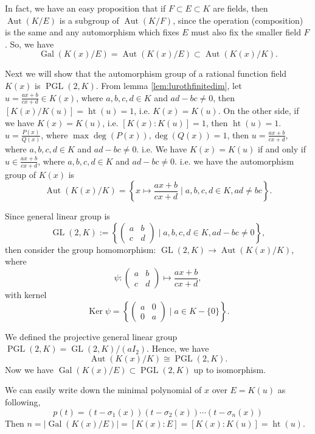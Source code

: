 In fact, we have an easy proposition that if $F\subset E\subset K$ are fields, then $\operatorname{Aut}(K/E)$ is a subgroup of $\operatorname{Aut}(K/F)$, since the operation (composition) is the same
and any automorphism which fixes $E$ must also fix the smaller field $F$. So, we have 
$$\operatorname{Gal}(K(x)/E)=\operatorname{Aut}(K(x)/E)\subset\operatorname{Aut}(K(x)/K).$$

Next we will show that the automorphism group of a rational function field $K(x)$ is $\operatorname{PGL}(2,K)$. 
From lemma \ref{lem:lurothfinitedim}, let $u=\frac{ax+b}{cx+d}\in K(x)$, where $a,b,c,d\in K$ and $ad-bc\neq0$, then $[K(x)/K(u)]=\operatorname{ht}(u)=1$, i.e. $K(x)=K(u)$. On the other side, if we have $K(x)=K(u)$, i.e. $[K(x):K(u)]=1$, then $\operatorname{ht}(u)=1$. $u=\frac{P(x)}{Q(x)}$, where $\max{\deg(P(x)),\deg(Q(x))}=1$, then $u=\frac{ax+b}{cx+d}$, where $a,b,c,d\in K$ and $ad-bc\neq0$. i.e. We have $K(x)=K(u)$ if and only if $u\in \frac{ax+b}{cx+d}$, where $a,b,c,d\in K$ and $ad-bc\neq0$. 
i.e. we have the automorphism group of $K(x)$ is $$\operatorname{Aut}(K(x)/K)=\left\{x\mapsto\frac{ax+b}{cx+d}\mid a,b,c,d\in K, ad\neq bc\right\}.$$

Since general linear group is $$\operatorname{GL}(2,K):=\left\{\begin{pmatrix}a&b\\c&d\end{pmatrix}\mid a,b,c,d\in K, ad-bc\neq0\right\},$$ then consider the group homomorphism: $\operatorname{GL}(2,K)\rightarrow \operatorname{Aut}(K(x)/K)$, where $$\psi: \begin{pmatrix}a&b\\c&d\end{pmatrix}\mapsto \frac{ax+b}{cx+d},$$
with kernel $$\operatorname{Ker}\psi=\left\{\begin{pmatrix}a&0\\0&a\end{pmatrix}\mid a\in K-\{0\}\right\}.$$

We defined the projective general linear group $\operatorname{PGL}(2,K)=\operatorname{GL}(2,K)/(aI_2)$. Hence, we have $$\operatorname{Aut}(K(x)/K)\cong\operatorname{PGL}(2,K).$$ Now we have $\operatorname{Gal}(K(x)/E)\subset \operatorname{PGL}(2,K)$ up to isomorphism. 

We can easily write down the minimal polynomial of $x$ over $E=K(u)$ as following, 
$$p(t)=(t-\sigma_1(x))(t-\sigma_2(x))\cdots(t-\sigma_n(x))$$
Then $n=|\operatorname{Gal}(K(x)/E)|=[K(x):E]=[K(x):K(u)]=\operatorname{ht}(u)$.  

